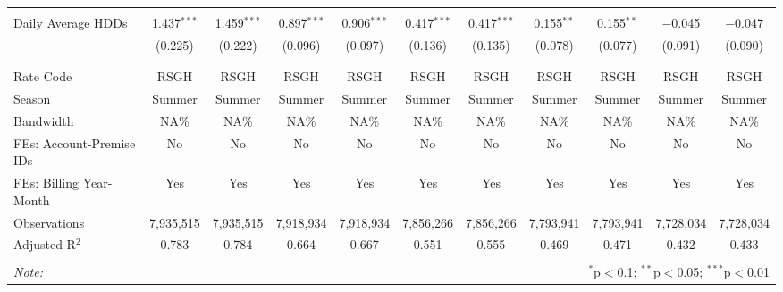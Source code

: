 \begin{table}[!htbp]
\begin{tabular}{@{\extracolsep{5pt}}lcccccccccc}
  & & & & & & & & & & \\ 
 Daily Average HDDs & 1.437$^{***}$ & 1.459$^{***}$ & 0.897$^{***}$ & 0.906$^{***}$ & 0.417$^{***}$ & 0.417$^{***}$ & 0.155$^{**}$ & 0.155$^{**}$ & $-$0.045 & $-$0.047 \\ 
  & (0.225) & (0.222) & (0.096) & (0.097) & (0.136) & (0.135) & (0.078) & (0.077) & (0.091) & (0.090) \\ 
  & & & & & & & & & & \\ 
\hline \\[-1.8ex] 
Rate Code & RSGH & RSGH & RSGH & RSGH & RSGH & RSGH & RSGH & RSGH & RSGH & RSGH \\ 
Season & Summer & Summer & Summer & Summer & Summer & Summer & Summer & Summer & Summer & Summer \\ 
Bandwidth & NA\% & NA\% & NA\% & NA\% & NA\% & NA\% & NA\% & NA\% & NA\% & NA\% \\ 
FEs: Account-Premise IDs & No & No & No & No & No & No & No & No & No & No \\ 
FEs: Billing Year-Month & Yes & Yes & Yes & Yes & Yes & Yes & Yes & Yes & Yes & Yes \\ 
Observations & 7,935,515 & 7,935,515 & 7,918,934 & 7,918,934 & 7,856,266 & 7,856,266 & 7,793,941 & 7,793,941 & 7,728,034 & 7,728,034 \\ 
Adjusted R$^{2}$ & 0.783 & 0.784 & 0.664 & 0.667 & 0.551 & 0.555 & 0.469 & 0.471 & 0.432 & 0.433 \\ 
\hline 
\hline \\[-1.8ex] 
\textit{Note:}  & \multicolumn{10}{r}{$^{*}$p$<$0.1; $^{**}$p$<$0.05; $^{***}$p$<$0.01} \\ 
\end{tabular} 
\end{table} 

